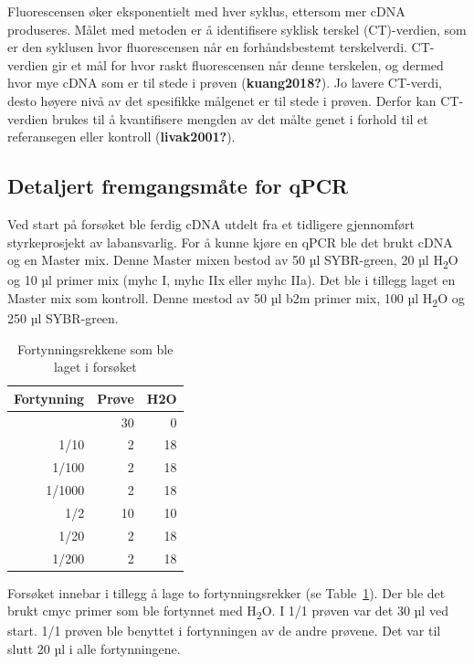 \documentclass[
  letterpaper,
  DIV=11,
  numbers=noendperiod]{scrreprt}
\begin{document}
Fluorescensen øker eksponentielt med hver syklus, ettersom mer cDNA
produseres. Målet med metoden er å identifisere syklisk terskel
(CT)-verdien, som er den syklusen hvor fluorescensen når en
forhåndsbestemt terskelverdi. CT-verdien gir et mål for hvor raskt
fluorescensen når denne terskelen, og dermed hvor mye cDNA som er til
stede i prøven (\textbf{kuang2018?}). Jo lavere CT-verdi, desto høyere
nivå av det spesifikke målgenet er til stede i prøven. Derfor kan
CT-verdien brukes til å kvantifisere mengden av det målte genet i
forhold til et referansegen eller kontroll (\textbf{livak2001?}).

\subsection{Detaljert fremgangsmåte for
qPCR}\label{detaljert-fremgangsmuxe5te-for-qpcr}

Ved start på forsøket ble ferdig cDNA utdelt fra et tidligere
gjennomført styrkeprosjekt av labansvarlig. For å kunne kjøre en qPCR
ble det brukt cDNA og en Master mix. Denne Master mixen bestod av 50 µl
SYBR-green, 20 µl H\textsubscript{2}O og 10 µl primer mix (myhc I, myhc
IIx eller myhc IIa). Det ble i tillegg laget en Master mix som kontroll.
Denne mestod av 50 µl b2m primer mix, 100 µl H\textsubscript{2}O og 250
µl SYBR-green.

\begingroup
\fontsize{12.0pt}{14.4pt}\selectfont

\begin{longtable}{rrr}

\caption{\label{tbl-fortynn}Fortynningsrekkene som ble laget i forsøket}

\tabularnewline

\toprule
Fortynning & Prøve & H2O \\ 
\midrule\addlinespace[2.5pt]
1 & 30 & 0 \\ 
1/10 & 2 & 18 \\ 
1/100 & 2 & 18 \\ 
1/1000 & 2 & 18 \\ 
1/2 & 10 & 10 \\ 
1/20 & 2 & 18 \\ 
1/200 & 2 & 18 \\ 
\bottomrule

\end{longtable}

\endgroup

Forsøket innebar i tillegg å lage to fortynningsrekker (se
Table~\ref{tbl-fortynn}). Der ble det brukt cmyc primer som ble
fortynnet med H\textsubscript{2}O. I 1/1 prøven var det 30 µl ved start.
1/1 prøven ble benyttet i fortynningen av de andre prøvene. Det var til
slutt 20 µl i alle fortynningene.
\end{document}
